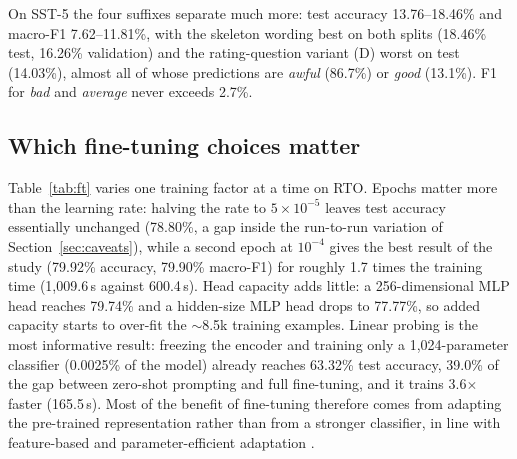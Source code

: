 \documentclass[11pt]{article}
\begin{document}
On SST-5 the four suffixes separate much more: test accuracy 13.76--18.46\% and macro-F1
7.62--11.81\%, with the skeleton wording best on both splits (18.46\% test, 16.26\% validation)
and the rating-question variant (D) worst on test (14.03\%), almost all of whose predictions are
\emph{awful} (86.7\%) or \emph{good} (13.1\%). F1 for \emph{bad} and \emph{average} never
exceeds 2.7\%.

\begin{table}[!ht]
\centering
\setlength{\tabcolsep}{4pt}
\caption{Rotten Tomatoes test results for the prompt variants (\%). Pos.\% is the share of
positive predictions; rows 1 and A use the same wording and differ only in batch size and the
execution pass, and now agree exactly, which is the batch-invariance check for the padding fix of
Section~\ref{sec:setup-problems}. SST-5 variants are summarised in the text. Source:
\texttt{artifacts/task1\_prompt\_variants.csv}.}
\label{tab:prompts}
\end{table}

\subsection{Which fine-tuning choices matter}
Table~\ref{tab:ft} varies one training factor at a time on RTO. Epochs matter more than the
learning rate: halving the rate to $5\times10^{-5}$ leaves test accuracy essentially unchanged
(78.80\%, a gap inside the run-to-run variation of Section~\ref{sec:caveats}), while a second
epoch at $10^{-4}$ gives the best result of the study (79.92\% accuracy, 79.90\% macro-F1) for
roughly 1.7 times the training time (1{,}009.6\,s against 600.4\,s). Head capacity adds little:
a 256-dimensional MLP head reaches 79.74\% and a hidden-size MLP head drops to 77.77\%, so added
capacity starts to over-fit the $\sim$8.5k training examples. Linear probing is the most
informative result: freezing the encoder and training only a 1{,}024-parameter classifier
(0.0025\% of the model) already reaches 63.32\% test accuracy, 39.0\% of the gap between
zero-shot prompting and full fine-tuning, and it trains 3.6$\times$ faster (165.5\,s). Most of the benefit of fine-tuning therefore comes from
adapting the pre-trained representation rather than from a stronger classifier, in line with
feature-based and parameter-efficient adaptation
\citep{peters-etal-2018-deep,devlin-etal-2019-bert,li-liang-2021-prefix,lester-etal-2021-power,gao-etal-2021-making}.
\end{document}
